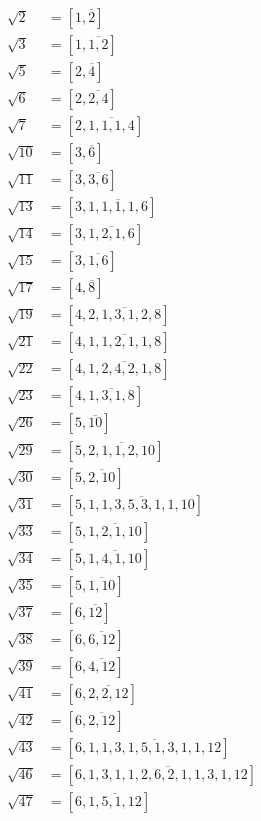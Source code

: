 \begin{figure}
  \begin{multicols}{2}
    \begin{align*}
      \sqrt{2} & = [1,\overline{2}] \\
      \sqrt{3} & = [1,\overline{1,2}] \\
      \sqrt{5} & = [2,\overline{4}] \\
      \sqrt{6} & = [2,\overline{2,4}] \\
      \sqrt{7} & = [2,\overline{1,1,1,4}] \\
      \sqrt{10} & = [3,\overline{6}] \\
      \sqrt{11} & = [3,\overline{3,6}] \\
      \sqrt{13} & = [3,\overline{1,1,1,1,6}] \\
      \sqrt{14} & = [3,\overline{1,2,1,6}] \\
      \sqrt{15} & = [3,\overline{1,6}] \\
      \sqrt{17} & = [4,\overline{8}] \\
      \sqrt{19} & = [4,\overline{2,1,3,1,2,8}] \\
      \sqrt{21} & = [4,\overline{1,1,2,1,1,8}] \\
      \sqrt{22} & = [4,\overline{1,2,4,2,1,8}] \\
      \sqrt{23} & = [4,\overline{1,3,1,8}] \\
      \sqrt{26} & = [5,\overline{10}] \\
      \sqrt{29} & = [5,\overline{2,1,1,2,10}] \\
      \sqrt{30} & = [5,\overline{2,10}] \\
      \sqrt{31} & = [5,\overline{1,1,3,5,3,1,1,10}] \\
      \sqrt{33} & = [5,\overline{1,2,1,10}] \\
      \sqrt{34} & = [5,\overline{1,4,1,10}] \\
      \sqrt{35} & = [5,\overline{1,10}] \\
      \sqrt{37} & = [6,\overline{12}] \\
      \sqrt{38} & = [6,\overline{6,12}] \\
      \sqrt{39} & = [6,\overline{4,12}] \\
      \sqrt{41} & = [6,\overline{2,2,12}] \\
      \sqrt{42} & = [6,\overline{2,12}] \\
      \sqrt{43} & = [6,\overline{1,1,3,1,5,1,3,1,1,12}] \\
      \sqrt{46} & = [6,\overline{1,3,1,1,2,6,2,1,1,3,1,12}] \\
      \sqrt{47} & = [6,\overline{1,5,1,12}]
    \end{align*}


\end{multicols}
\end{figure}
